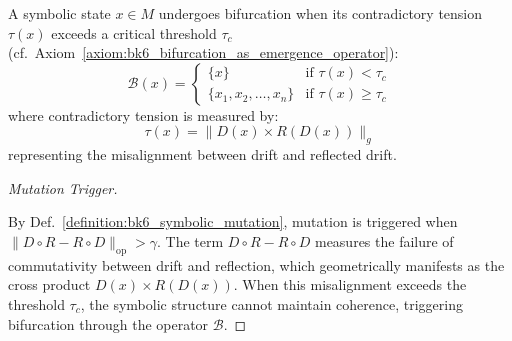 \begin{proposition}
\label{proposition:bk6_bifurcation_threshold}
A symbolic state $x \in M$ undergoes bifurcation when its contradictory tension $\tau(x)$ exceeds a critical threshold $\tau_c$ (cf.~Axiom~\ref{axiom:bk6_bifurcation_as_emergence_operator}):
\begin{equation}
\mathcal{B}(x) = \begin{cases}
\{x\} & \text{if } \tau(x) < \tau_c \\
\{x_1, x_2, \ldots, x_n\} & \text{if } \tau(x) \geq \tau_c
\end{cases}
\end{equation}
where contradictory tension is measured by:
\begin{equation}
\tau(x) = \|D(x) \times R(D(x))\|_g
\end{equation}
representing the misalignment between drift and reflected drift.
\begin{proof}[Mutation Trigger]
\label{proof:bk6_mutation_trigger}
\leavevmode

By Def.~\ref{definition:bk6_symbolic_mutation}, mutation is triggered when $\|D \circ R - R \circ D\|_{\text{op}} > \gamma$. The term $D \circ R - R \circ D$ measures the failure of commutativity between drift and reflection, which geometrically manifests as the cross product $D(x) \times R(D(x))$. When this misalignment exceeds the threshold $\tau_c$, the symbolic structure cannot maintain coherence, triggering bifurcation through the operator $\mathcal{B}$.
\end{proof}
\end{proposition}
